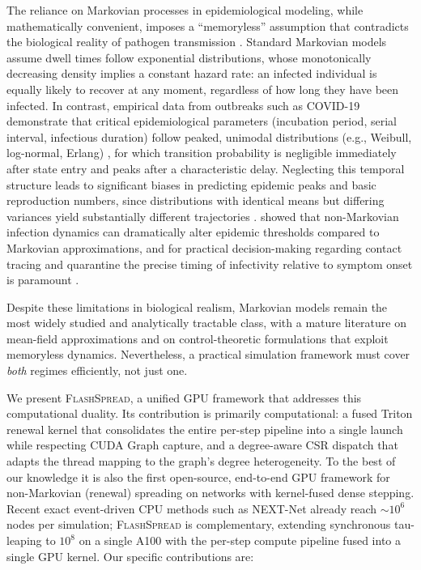 \documentclass[a4paper,fleqn]{cas-sc}
\theoremstyle{definition}
\theoremstyle{remark}
\newcommand{\flashspread}{\textsc{FlashSpread}}
\begin{document}
The reliance on Markovian processes in epidemiological modeling, while mathematically convenient, imposes a ``memoryless'' assumption that contradicts the biological reality of pathogen transmission \citep{vajdi2023non}. Standard Markovian models assume dwell times follow exponential distributions, whose monotonically decreasing density implies a constant hazard rate: an infected individual is equally likely to recover at any moment, regardless of how long they have been infected. In contrast, empirical data from outbreaks such as COVID-19 demonstrate that critical epidemiological parameters (incubation period, serial interval, infectious duration) follow peaked, unimodal distributions (e.g., Weibull, log-normal, Erlang) \citep{sanche2020high, backer2020incubation, lauer2020incubation}, for which transition probability is negligible immediately after state entry and peaks after a characteristic delay. Neglecting this temporal structure leads to significant biases in predicting epidemic peaks and basic reproduction numbers, since distributions with identical means but differing variances yield substantially different trajectories \citep{vajdi2023non, sherborne2018mean, feng2019equivalence}. \citet{van2013non} showed that non-Markovian infection dynamics can dramatically alter epidemic thresholds compared to Markovian approximations, and for practical decision-making regarding contact tracing and quarantine the precise timing of infectivity relative to symptom onset is paramount \citep{vajdi2023non, he2020temporal}.

Despite these limitations in biological realism, Markovian models remain the most widely studied and analytically tractable class, with a mature literature on mean-field approximations \citep{keeling2005networks, kiss2017mathematics} and on control-theoretic formulations \citep{nowzari2016analysis, watkins2019robust, preciado2014optimal} that exploit memoryless dynamics. Nevertheless, a practical simulation framework must cover \emph{both} regimes efficiently, not just one.

We present \flashspread{}, a unified GPU framework that addresses this computational duality. Its contribution is primarily computational: a fused Triton renewal kernel that consolidates the entire per-step pipeline into a single launch while respecting CUDA Graph capture, and a degree-aware CSR dispatch that adapts the thread mapping to the graph's degree heterogeneity. To the best of our knowledge it is also the first open-source, end-to-end GPU framework for non-Markovian (renewal) spreading on networks with kernel-fused dense stepping. Recent exact event-driven CPU methods such as NEXT-Net \citep{cure2025fast} already reach $\sim$$10^6$ nodes per simulation; \flashspread{} is complementary, extending synchronous tau-leaping to $10^8$ on a single A100 with the per-step compute pipeline fused into a single GPU kernel. Our specific contributions are:
\end{document}
